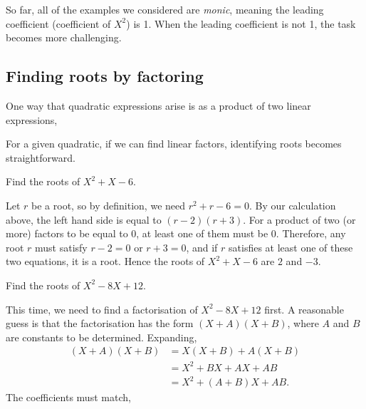So far, all of the examples we considered are \emph{monic}, meaning the leading coefficient (coefficient of $X^2$) is 1. When the leading coefficient is not 1, the task becomes more challenging.


\subsection{Finding roots by factoring}

One way that quadratic expressions arise is as a product of two linear expressions,

For a given quadratic, if we can find linear factors, identifying roots becomes straightforward.

\begin{example}
Find the roots of $X^2 + X - 6$. 
\end{example}
\begin{solution}
Let $r$ be a root, so by definition, we need $r^2 + r - 6 = 0$. By our calculation above, the left hand side is equal to $(r - 2)(r + 3)$. For a product of two (or more) factors to be equal to $0$, at least one of them must be $0$. Therefore, any root $r$ must satisfy $r - 2 = 0$ or $r + 3 = 0$, and if $r$ satisfies at least one of these two equations, it is a root. Hence the roots of $X^2 + X - 6$ are $2$ and $-3$.
\end{solution}

\begin{example}
Find the roots of $X^2 - 8X + 12$.
\end{example}
\begin{solution}
This time, we need to find a factorisation of $X^2 - 8X + 12$ first. A reasonable guess is that the factorisation has the form $(X + A)(X + B)$, where $A$ and $B$ are constants to be determined. Expanding,
\begin{align*}
(X + A)(X + B) &= X(X + B) + A(X + B) \\
&= X^2 + BX + AX + AB \\
&= X^2 + (A + B)X + AB.
\end{align*}
The coefficients must match, 
\end{solution}